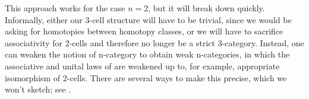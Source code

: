 \documentclass[11 pt]{amsart}
\theoremstyle{plain}   %
\theoremstyle{definition}
\theoremstyle{remark}
\numberwithin{equation}{section}
\begin{document}
This approach works for the case $n=2$, but it will break down quickly.
Informally, either our 3-cell structure will have to be trivial, since we would
be asking for homotopies between homotopy classes, or we will have to sacrifice
associativity for 2-cells and therefore no longer be a strict 3-category.
Instead, one can weaken the notion of n-category to obtain weak n-categories, in
which the associative and unital laws of  are weakened up to,
for example, appropriate isomorphism of 2-cells. There are several ways to make
this precise, which we won't sketch; see \cite{Leinster}.




\end{document}
